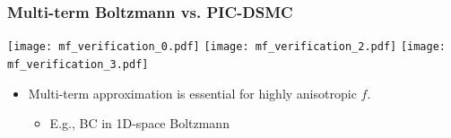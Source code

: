 \documentclass[mathserif, aspectratio=169]{beamer}
\begin{document}
\begin{frame}
	\frametitle{Multi-term Boltzmann vs. PIC-DSMC}
	\vspace{-0.25in}
	\begin{center}
		\texttt{[image: mf\_verification\_0.pdf]}
		\texttt{[image: mf\_verification\_2.pdf]}
		\texttt{[image: mf\_verification\_3.pdf]}
	\end{center}
	\begin{itemize}
		\item Multi-term approximation is essential for highly anisotropic $f$. 
		\begin{itemize}
			\item E.g., BC in 1D-space Boltzmann
		\end{itemize}
	\end{itemize}
\end{frame}



\end{document}
